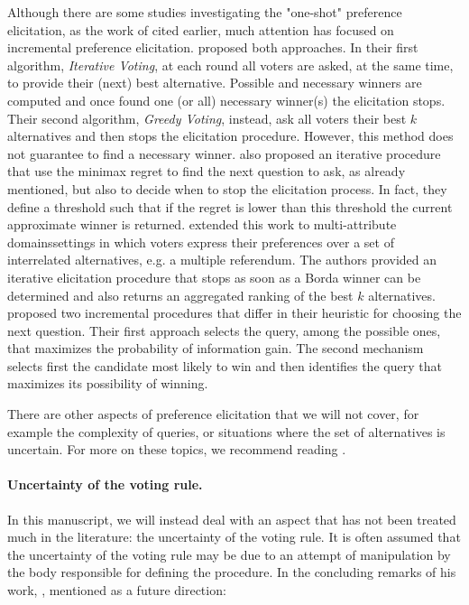 Although there are some studies investigating the "one-shot" preference elicitation, as the work of \citet{Lu2011Prob} cited earlier, much attention has focused on incremental preference elicitation.
\citet{Kalech2011} proposed both approaches. In their first algorithm, \textit{Iterative Voting}, at each round all voters are asked, at the same time, to provide their (next) best alternative. Possible and necessary winners are computed and once found one (or all) necessary winner(s) the elicitation stops. Their second algorithm, \textit{Greedy Voting}, instead, ask all voters their best $k$ alternatives and then stops the elicitation procedure. However, this method does not guarantee to find a necessary winner.
\citet{Lu2011} also proposed an iterative procedure that use the minimax regret to find the next question to ask, as already mentioned, but also to decide when to stop the elicitation process. In fact, they define a threshold such that if the regret is lower than this threshold the current approximate winner is returned.
\citet{Benabbou2016} extended this work to multi-attribute domains\textemdash settings in which voters express their preferences over a set of interrelated alternatives, e.g. a multiple referendum. The authors provided an iterative elicitation procedure that stops as soon as a Borda winner can be determined and also returns an aggregated ranking of the best $k$ alternatives.
\citet{Naamani-Dery2015} proposed two incremental procedures that differ in their heuristic for choosing the next question. Their first approach selects the query, among the possible ones, that maximizes the probability of information gain. The second mechanism selects first the candidate most likely to win and then identifies the query that maximizes its possibility of winning.

There are other aspects of preference elicitation that we will not cover, for example the complexity of queries, or situations where the set of alternatives is uncertain. For more on these topics, we recommend reading \citet[Ch. 10]{Comsoc2016}.
\paragraph{Uncertainty of the voting rule.}
In this manuscript, we will instead deal with an aspect that has not been treated much in the literature: the uncertainty of the voting rule. It is often assumed that the uncertainty of the voting rule may be due to an attempt of manipulation by the body responsible for defining the procedure. In the concluding remarks of his work, \citet{Walsh2007}, mentioned as a future direction:

